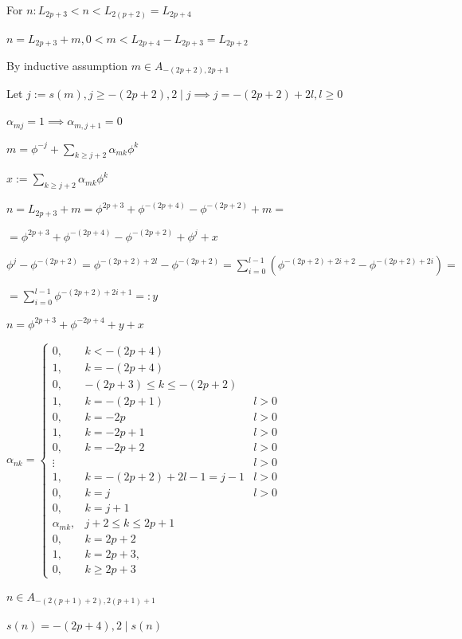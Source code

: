 \documentclass{article}
\begin{document}
For \( n: L_{2p+3} < n < L_{2(p+2)} = L_{2p+4} \)

\( n = L_{2p+3} + m, 0 < m < L_{2p+4} - L_{2p+3} = L_{2p+2} \)

By inductive assumption \( m \in A_{-(2p+2),2p+1} \)

Let \( j := s(m), j \geq -(2p+2), 2 \mid j \implies j = -(2p+2) + 2l, l \geq 0 \)

\( \alpha_{mj} = 1 \implies \alpha_{m,j+1} = 0 \)

\( m = \phi^{-j} + \sum_{k \geq j + 2} \alpha_{mk} \phi^{k} \)

\( x := \sum_{k \geq j + 2} \alpha_{mk} \phi^{k} \)

\( n = L_{2p+3} + m = \phi^{2p+3} + \phi^{-(2p+4)} - \phi^{-(2p+2)} + m = \)

\( = \phi^{2p+3} + \phi^{-(2p+4)} - \phi^{-(2p+2)} + \phi^{j} + x \)

\( \phi^{j} - \phi^{-(2p+2)} = \phi^{-(2p+2) + 2l} - \phi^{-(2p+2)} = \sum_{i=0}^{l-1}(\phi^{-(2p+2) + 2i+2} - \phi^{-(2p+2) + 2i}) = \)

\( = \sum_{i=0}^{l-1} \phi^{-(2p+2) + 2i+1} =: y \)

\( n = \phi^{2p+3} + \phi^{-2p+4} + y + x \)

\( \alpha_{nk} = \left\{\begin{array}{lll} 0, & k < -(2p+4)\\1, & k = -(2p+4)\\0, & -(2p+3) \leq k \leq -(2p+2)\\ 1, & k = -(2p+1) & l > 0 \\ 0, & k = -2p & l > 0 \\ 1, & k = -2p+1 & l >0 \\ 0, & k = -2p+2 & l >0\\ \vdots && l > 0 \\ 1, & k = -(2p+2) + 2l - 1 = j - 1 & l > 0 \\ 0, & k = j & l > 0 \\ 0, & k = j + 1\\ \alpha_{mk}, & j + 2 \leq k \leq 2p + 1 \\ 0, & k = 2p + 2\\ 1, & k = 2p+3, \\ 0, & k \geq 2p + 3 \end{array}\right. \)

\( n \in A_{-(2(p+1)+2),2(p+1)+1} \)

\( s(n) = -(2p+4), 2 \mid s(n) \)
\end{document}
